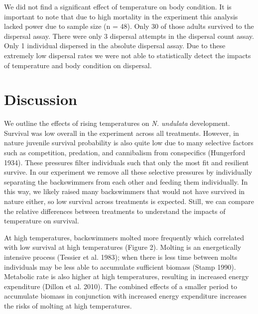 \documentclass[
]{article}
\begin{document}
We did not find a significant effect of temperature on body condition.
It is important to note that due to high mortality in the experiment
this analysis lacked power due to sample size (n = 48). Only 30 of those
adults survived to the dispersal assay. There were only 3 dispersal
attempts in the dispersal count assay. Only 1 individual dispersed in
the absolute dispersal assay. Due to these extremely low dispersal rates
we were not able to statistically detect the impacts of temperature and
body condition on dispersal.

\section{Discussion}\label{discussion}

We outline the effects of rising temperatures on \emph{N. undulata}
development. Survival was low overall in the experiment across all
treatments. However, in nature juvenile survival probability is also
quite low due to many selective factors such as competition, predation,
and cannibalism from conspecifics (Hungerford 1934). These pressures
filter individuals such that only the most fit and resilient survive. In
our experiment we remove all these selective pressures by individually
separating the backswimmers from each other and feeding them
individually. In this way, we likely raised many backswimmers that would
not have survived in nature either, so low survival across treatments is
expected. Still, we can compare the relative differences between
treatments to understand the impacts of temperature on survival.

At high temperatures, backswimmers molted more frequently which
correlated with low survival at high temperatures (Figure 2). Molting is
an energetically intensive process (Tessier et al. 1983); when there is
less time between molts individuals may be less able to accumulate
sufficient biomass (Stamp 1990). Metabolic rate is also higher at high
temperatures, resulting in increased energy expenditure (Dillon et al.
2010). The combined effects of a smaller period to accumulate biomass in
conjunction with increased energy expenditure increases the risks of
molting at high temperatures.
\end{document}
